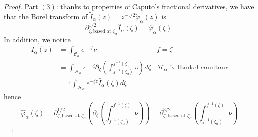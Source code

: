 \documentclass[11pt,a4paper,twoside,leqno,noamsfonts]{amsart}
\numberwithin{equation}{section}
\begin{document}
\begin{proof}
Part $(3)$: thanks to properties of Caputo's fractional derivatives, we have that the Borel transform of $\tilde{I}_{\alpha}(z)=z^{-1/2}\tilde{\varphi}_\alpha(z)$ is 
\begin{equation}
\partial^{1/2}_{\zeta, \text{based at }\zeta_\alpha}\hat{I}_{\alpha}(\zeta)=\hat{\varphi}_{\alpha}(\zeta).
\end{equation} 
In addition, we notice 
\begin{align*}
I_{\alpha}(z)&=\int_{\mathcal{C}_{\alpha}}e^{-zf}\nu & f=\zeta\\
&=\int_{\mathcal{H}_{\alpha}}e^{-z\zeta}\partial_{\zeta}\left(\int_{f^{-1}(\zeta_\alpha)}^{f^{-1}(\zeta)}\nu\right)d\zeta   & \mathcal{H}_{\alpha} \text{ is Hankel countour} \\
&=:\int_{\mathcal{H}_{\alpha}}e^{-\zeta z}\hat{I}_{\alpha}(\zeta)d\zeta &
\end{align*}
hence 
\begin{equation}
\hat{\varphi}_{\alpha}(\zeta)=\partial^{1/2}_{\zeta, \text{based at } \zeta_\alpha}\left(\partial_{\zeta}\left(\int_{f^{-1}(\zeta_\alpha)}^{f^{-1}(\zeta)}\nu\right)\right)=\partial^{3/2}_{\zeta, \text{based at } \zeta_\alpha}\left(\int_{f^{-1}(\zeta_\alpha)}^{f^{-1}(\zeta)}\nu\right)
\end{equation}
\end{proof}
\end{document}
